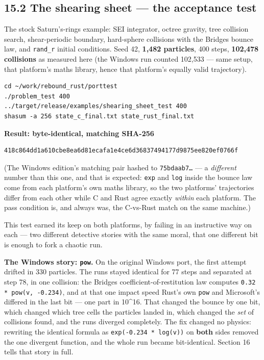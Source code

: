 \documentclass[11pt]{article}
\begin{document}
\subsection{15.2 The shearing sheet --- the acceptance test}

The stock Saturn's-rings example: SEI integrator, octree gravity, tree collision search, shear-periodic boundary, hard-sphere collisions with the Bridges bounce law, and \texttt{rand\_r} initial conditions. Seed 42, \textbf{1,482 particles}, 400 steps, \textbf{102,478 collisions} as measured here (the Windows run counted 102,533 --- same setup, that platform's maths library, hence that platform's equally valid trajectory).

\begin{lstlisting}
cd ~/work/rebound_rust/porttest
./problem_test 400
../target/release/examples/shearing_sheet_test 400
shasum -a 256 state_c_final.txt state_rust_final.txt
\end{lstlisting}

\textbf{Result: byte-identical, matching SHA-256}

\begin{lstlisting}
418c864dd1a610cbe8ea6d81ecafa1e4ce6d36837494177d9875ee820ef0766f
\end{lstlisting}

(The Windows edition's matching pair hashed to \texttt{75bdaab7\ldots{}} --- a \emph{different} number than this one, and that is expected: \texttt{exp} and \texttt{log} inside the bounce law come from each platform's own maths library, so the two platforms' trajectories differ from each other while C and Rust agree exactly \emph{within} each platform. The pass condition is, and always was, the C-vs-Rust match on the same machine.)

This test earned its keep on both platforms, by failing in an instructive way on each --- two different detective stories with the same moral, that one different bit is enough to fork a chaotic run.

\textbf{The Windows story: \texttt{pow}.} On the original Windows port, the first attempt drifted in 330 particles. The runs stayed identical for 77 steps and separated at step 78, in one collision: the Bridges coefficient-of-restitution law computes \texttt{0.32 * pow(v, -0.234)}, and at that one impact speed Rust's own \texttt{pow} and Microsoft's differed in the last bit --- one part in 10\textasciicircum{}16. That changed the bounce by one bit, which changed which tree cells the particles landed in, which changed the \emph{set} of collisions found, and the runs diverged completely. The fix changed no physics: rewriting the identical formula as \texttt{exp(-0.234 * log(v))} on \textbf{both} sides removed the one divergent function, and the whole run became bit-identical. Section 16 tells that story in full.
\end{document}
